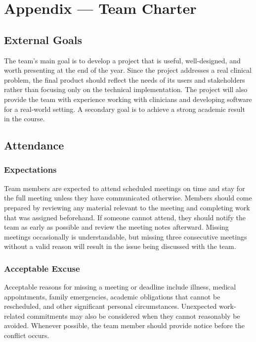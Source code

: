 \documentclass{article}
\begin{document}
\newpage{}

\section{Appendix --- Team Charter}

\subsection*{External Goals}

The team's main goal is to develop a project that is useful, well-designed, and
worth presenting at the end of the year. Since the project addresses a real clinical problem,
the final product should reflect the needs of its users and stakeholders rather than focusing
only on the technical implementation. The project will also provide the team with experience
working with clinicians and developing software for a real-world setting. A secondary goal
is to achieve a strong academic result in the course.

\subsection*{Attendance}

\subsubsection*{Expectations}

Team members are expected to attend scheduled meetings on time and stay for the full meeting
unless they have communicated otherwise. Members should come prepared by reviewing any material
relevant to the meeting and completing work that was assigned beforehand. If someone cannot attend,
they should notify the team as early as possible and review the meeting notes afterward.
Missing meetings occasionally is understandable, but missing three consecutive meetings without
a valid reason will result in the issue being discussed with the team.

\subsubsection*{Acceptable Excuse}

Acceptable reasons for missing a meeting or deadline include illness, medical appointments,
family emergencies, academic obligations that cannot be rescheduled, and other significant
personal circumstances. Unexpected work-related commitments may also be considered when they
cannot reasonably be avoided. Whenever possible, the team member should provide notice before
the conflict occurs.
\end{document}
